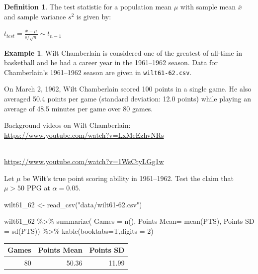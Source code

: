 \documentclass[
  11pt,
]{book}
\newenvironment{Shaded}{\begin{snugshade}}{\end{snugshade}}
\newcommand{\AttributeTok}[1]{\textcolor[rgb]{0.77,0.63,0.00}{#1}}
\newcommand{\DecValTok}[1]{\textcolor[rgb]{0.00,0.00,0.81}{#1}}
\newcommand{\FunctionTok}[1]{\textcolor[rgb]{0.00,0.00,0.00}{#1}}
\newcommand{\NormalTok}[1]{#1}
\newcommand{\OtherTok}[1]{\textcolor[rgb]{0.56,0.35,0.01}{#1}}
\newcommand{\SpecialCharTok}[1]{\textcolor[rgb]{0.00,0.00,0.00}{#1}}
\newcommand{\StringTok}[1]{\textcolor[rgb]{0.31,0.60,0.02}{#1}}
\theoremstyle{definition}
\newtheorem{definition}{Definition}[chapter]
\theoremstyle{definition}
\newtheorem{example}{Example}[chapter]
\theoremstyle{definition}
\theoremstyle{definition}
\theoremstyle{remark}
\begin{document}
\begin{definition}
The test statistic for a population mean \(\mu\) with sample mean \(\bar{x}\) and sample variance \(s^2\) is given by:

\(t_{test} = \frac{\bar{x}-\mu}{s/\sqrt{n}} \sim t_{n-1}\)
\end{definition}

\begin{example}
Wilt Chamberlain is considered one of the greatest of all-time in basketball and he had a career year in the 1961--1962 season. Data for Chamberlain's 1961--1962 season are given in \texttt{wilt61-62.csv}.

On March 2, 1962, Wilt Chamberlain scored 100 points in a single game. He also averaged 50.4 points per game (standard deviation: 12.0 points) while playing an average of 48.5 minutes per game over 80 games.

Background videos on Wilt Chamberlain:\\
\url{https://www.youtube.com/watch?v=LxMeEzhvNRs}\strut \\
\url{https://www.youtube.com/watch?v=1WsCtyLGg1w}

Let \(\mu\) be Wilt's true point scoring ability in 1961--1962. Test the claim that \(\mu > 50\) PPG at \(\alpha=0.05\).
\end{example}

\vfill

\newpage

\begin{Shaded}
\begin{Highlighting}[]
\NormalTok{wilt61\_62 }\OtherTok{\textless{}{-}} \FunctionTok{read\_csv}\NormalTok{(}\StringTok{"data/wilt61{-}62.csv"}\NormalTok{)}

\NormalTok{wilt61\_62 }\SpecialCharTok{\%\textgreater{}\%} \FunctionTok{summarize}\NormalTok{(}
  \AttributeTok{Games =} \FunctionTok{n}\NormalTok{(), }
  \StringTok{\textasciigrave{}}\AttributeTok{Points Mean}\StringTok{\textasciigrave{}}\OtherTok{=} \FunctionTok{mean}\NormalTok{(PTS),}
  \StringTok{\textasciigrave{}}\AttributeTok{Points SD}\StringTok{\textasciigrave{}} \OtherTok{=} \FunctionTok{sd}\NormalTok{(PTS)) }\SpecialCharTok{\%\textgreater{}\%} 
  \FunctionTok{kable}\NormalTok{(}\AttributeTok{booktabs=}\NormalTok{T,}\AttributeTok{digits =} \DecValTok{2}\NormalTok{)}
\end{Highlighting}
\end{Shaded}

\begin{tabular}{rrr}
\toprule
Games & Points Mean & Points SD\\
\midrule
80 & 50.36 & 11.99\\
\bottomrule
\end{tabular}
\end{document}
